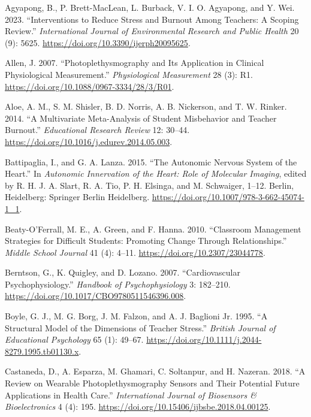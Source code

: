 \documentclass[preprint,
3p]{elsarticle} %
\newlength{\cslhangindent}
\newenvironment{CSLReferences}[2] %
 {\begin{list}{}{%
  \setlength{\itemindent}{0pt}
  \setlength{\leftmargin}{0pt}
  \setlength{\parsep}{0pt}
  \ifodd #1
   \setlength{\leftmargin}{\cslhangindent}
   \setlength{\itemindent}{-1\cslhangindent}
  \fi
  \setlength{\itemsep}{#2\baselineskip}}}
 {\end{list}}
\begin{document}
\label{refs}
\begin{CSLReferences}{1}{0}
Agyapong, B., P. Brett-MacLean, L. Burback, V. I. O. Agyapong, and Y.
Wei. 2023. {``Interventions to Reduce Stress and Burnout Among Teachers:
A Scoping Review.''} \emph{International Journal of Environmental
Research and Public Health} 20 (9): 5625.
\url{https://doi.org/10.3390/ijerph20095625}.

Allen, J. 2007. {``Photoplethysmography and Its Application in Clinical
Physiological Measurement.''} \emph{Physiological Measurement} 28 (3):
R1. \url{https://doi.org/10.1088/0967-3334/28/3/R01}.

Aloe, A. M., S. M. Shisler, B. D. Norris, A. B. Nickerson, and T. W.
Rinker. 2014. {``A Multivariate Meta-Analysis of Student Misbehavior and
Teacher Burnout.''} \emph{Educational Research Review} 12: 30--44.
\url{https://doi.org/10.1016/j.edurev.2014.05.003}.

Battipaglia, I., and G. A. Lanza. 2015. {``The Autonomic Nervous System
of the Heart.''} In \emph{Autonomic Innervation of the Heart: Role of
Molecular Imaging}, edited by R. H. J. A. Slart, R. A. Tio, P. H.
Elsinga, and M. Schwaiger, 1--12. Berlin, Heidelberg: Springer Berlin
Heidelberg. \url{https://doi.org/10.1007/978-3-662-45074-1_1}.

Beaty-O'Ferrall, M. E., A. Green, and F. Hanna. 2010. {``Classroom
Management Strategies for Difficult Students: Promoting Change Through
Relationships.''} \emph{Middle School Journal} 41 (4): 4--11.
\url{https://doi.org/10.2307/23044778}.

Berntson, G., K. Quigley, and D. Lozano. 2007. {``Cardiovascular
Psychophysiology.''} \emph{Handbook of Psychophysiology} 3: 182--210.
\url{https://doi.org/10.1017/CBO9780511546396.008}.

Boyle, G. J., M. G. Borg, J. M. Falzon, and A. J. Baglioni Jr. 1995.
{``A Structural Model of the Dimensions of Teacher Stress.''}
\emph{British Journal of Educational Psychology} 65 (1): 49--67.
\url{https://doi.org/10.1111/j.2044-8279.1995.tb01130.x}.

Castaneda, D., A. Esparza, M. Ghamari, C. Soltanpur, and H. Nazeran.
2018. {``A Review on Wearable Photoplethysmography Sensors and Their
Potential Future Applications in Health Care.''} \emph{International
Journal of Biosensors \& Bioelectronics} 4 (4): 195.
\url{https://doi.org/10.15406/ijbsbe.2018.04.00125}.


\end{CSLReferences}
\end{document}
